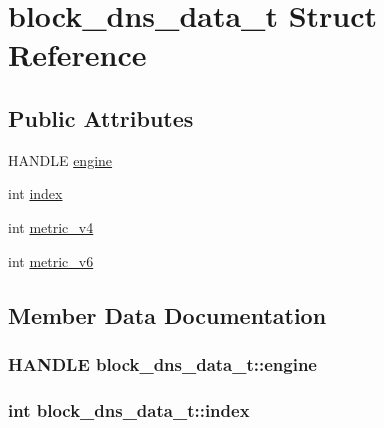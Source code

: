 \hypertarget{structblock__dns__data__t}{}\section{block\+\_\+dns\+\_\+data\+\_\+t Struct Reference}
\label{structblock__dns__data__t}
\subsection*{Public Attributes}
\begin{DoxyCompactItemize}
\item 
H\+A\+N\+D\+L\+E \hyperlink{structblock__dns__data__t_a3b08c75ccf068ddd692bdf1f4ab59ae1}{engine}
\item 
int \hyperlink{structblock__dns__data__t_abf7f3823d4e65a955a640548588dba20}{index}
\item 
int \hyperlink{structblock__dns__data__t_a280851190c1998268fc3c69d14c50c69}{metric\+\_\+v4}
\item 
int \hyperlink{structblock__dns__data__t_a67bdfe74f6a138956b2b35afd97d5273}{metric\+\_\+v6}
\end{DoxyCompactItemize}


\subsection{Member Data Documentation}
\hypertarget{structblock__dns__data__t_a3b08c75ccf068ddd692bdf1f4ab59ae1}{}
\subsubsection[{engine}]{\setlength{\rightskip}{0pt plus 5cm}H\+A\+N\+D\+L\+E block\+\_\+dns\+\_\+data\+\_\+t\+::engine}\label{structblock__dns__data__t_a3b08c75ccf068ddd692bdf1f4ab59ae1}
\hypertarget{structblock__dns__data__t_abf7f3823d4e65a955a640548588dba20}{}
\subsubsection[{index}]{\setlength{\rightskip}{0pt plus 5cm}int block\+\_\+dns\+\_\+data\+\_\+t\+::index}\label{structblock__dns__data__t_abf7f3823d4e65a955a640548588dba20}
\hypertarget{structblock__dns__data__t_a280851190c1998268fc3c69d14c50c69}{}
